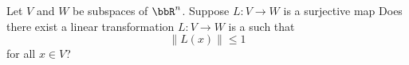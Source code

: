 \begin{questions}
  \question Let $V$ and $W$ be subspaces of $\bbR^n$. Suppose $L\colon V\to
  W$ is a surjective map
  \question Does there exist a linear transformation $L\colon V\to W$ is a
  such that
  \[
    \|L(x)\|\leq 1
  \]
  for all $x\in V$?
\end{questions}

